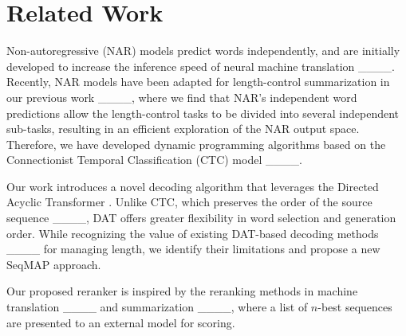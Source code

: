 \section{Related Work}
Non-autoregressive (NAR) models predict words independently, 
and are initially developed to increase the inference speed of neural machine translation ____.
Recently, NAR models have been adapted for length-control summarization in our previous work ____, where we find that NAR's independent word predictions allow the length-control tasks to be divided into several independent sub-tasks, resulting in an efficient exploration of the NAR output space. Therefore, we have developed dynamic programming algorithms based on the Connectionist Temporal Classification (CTC) model ____.

Our work introduces a novel decoding algorithm that leverages the Directed Acyclic Transformer \cite[DAT,][]{huang2022directed}. Unlike CTC, which preserves the order of the source sequence ____, DAT offers greater flexibility in word selection and generation order. While recognizing the value of existing DAT-based decoding methods ____ for managing length, we identify their limitations and propose a new SeqMAP approach.

Our proposed reranker is inspired by the reranking methods in machine translation ____ and summarization ____, where a list of $n$-best sequences are presented to an external model for scoring.